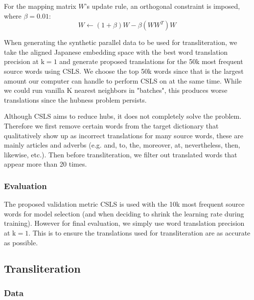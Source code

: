 \documentclass{article}
\begin{document}
\noindent
For the mapping matrix $W$'s update rule, an orthogonal constraint is imposed, where
$\beta=0.01$:
$$
W \leftarrow (1 + \beta)W - \beta(WW^T)W
$$

When generating the synthetic parallel data to be used for transliteration, we take
the aligned Japanese embedding space with the best word translation precision
at $\text{k}=1$ and generate proposed translations for the 50k most frequent
source words using CSLS. We choose the top 50k words since that is the largest
amount our computer can handle to perform CSLS on at the same time. While we could
run vanilla K nearest neighbors in "batches", this produces worse translations
since the hubness problem persists.

Although CSLS aims to reduce hubs, it does not completely solve the problem.
Therefore we first remove certain words from the target dictionary that qualitatively
show up as incorrect translations for many source words, these are mainly articles
and adverbs (e.g. and, to, the, moreover, at, nevertheless, then, likewise, etc.).
Then before transliteration, we filter out translated words that appear more than
20 times.

\subsubsection*{Evaluation}

The proposed validation metric CSLS is used with the 10k most frequent source words
for model selection (and when deciding to shrink the learning rate during training).
However for final evaluation, we simply use word translation precision at
$\text{k}=1$. This is to ensure the translations used for transliteration are as
accurate as possible.

\subsection*{Transliteration}

\subsubsection*{Data}
\end{document}
